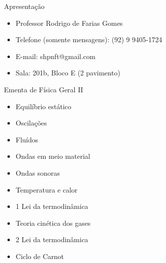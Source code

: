 \documentclass[t,%
brazilian,%
11pt,%
aspectratio=169,%
table%
]{beamer}
\title{\Disciplina}
\author{\Professor}
\date{\Periodo}
\newcommand{\esima}{\textordfeminine }
\newcommand{\esimo}{\textordmasculine }
\def\Disciplina{Física Geral II}
\begin{document}
\begin{frame}
    \titlepage
\end{frame}


\begin{frame}{Apresentação}
    \begin{itemize}
        \item Professor {\selectfont Rodrigo de Farias Gomes}
        \item Telefone (somente mensagens): (92) 9 9405-1724
        \item E-mail: shpnft@gmail.com
        \item Sala: 201b, Bloco E (2\esimo{} pavimento)
    \end{itemize}
\end{frame}

\begin{frame}{Ementa de \Disciplina}
    \begin{itemize}
        \item Equilíbrio estático
        \item Oscilações
        \item Fluídos
        \item Ondas em meio material
        \item Ondas sonoras
        \item Temperatura e calor
        \item 1\esima{} Lei da termodinâmica
        \item Teoria cinética dos gases
        \item 2\esima{} Lei da termodinâmica
        \item Ciclo de Carnot
    \end{itemize}
\end{frame}
\end{document}
